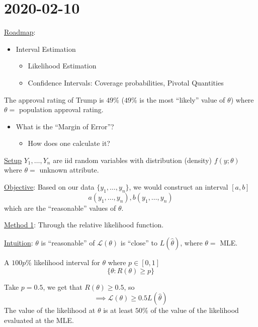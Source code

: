 \section{2020-02-10}
\underline{Roadmap}:
\begin{itemize}
    \item Interval Estimation
          \begin{itemize}
              \item Likelihood Estimation
              \item Confidence Intervals: Coverage probabilities, Pivotal Quantities
          \end{itemize}
\end{itemize}

\begin{Example}{}{}
    The approval rating of Trump is $ 49\% $ ($ 49\% $ is the most ``likely'' value of $ \theta $)
    where $ \theta= $ population approval rating.
    \begin{itemize}
        \item What is the ``Margin of Error''?
              \begin{itemize}
                  \item How does one calculate it?
              \end{itemize}
    \end{itemize}
\end{Example}

\underline{Setup} $ Y_1,\ldots ,Y_n $ are iid random variables with
distribution (density) $ f(y;\theta) $ where $ \theta= $ unknown attribute.

\underline{Objective}: Based on our data $ \{y_1,\ldots ,y_n\} $, we would
construct an interval $ [a,b] $
\[ a(y_1,\ldots ,y_n),b(y_1,\ldots ,y_n) \]
which are the ``reasonable'' values of $ \theta $.

\underline{Method 1}: Through the relative likelihood function.

\underline{Intuition}: $ \theta $ is ``reasonable'' of $ \mathcal{L}(\theta) $
is ``close'' to $ L(\hat{\theta}) $, where $ \theta= $ MLE\@.


\begin{Definition}{}{}
    A $ 100p\% $ likelihood interval for $ \theta $ where $ p\in[0,1] $
    \[ \{\theta:R(\theta)\geqslant p\} \]
\end{Definition}

Take $ p=0.5 $, we get that $ R(\theta)\geqslant 0.5 $, so
\[ \implies \mathcal{L}(\theta)\geqslant 0.5 L(\hat{\theta}) \]
The value of the likelihood at $ \theta $ is at least $ 50\% $ of the value of the
likelihood evaluated at the MLE\@.

